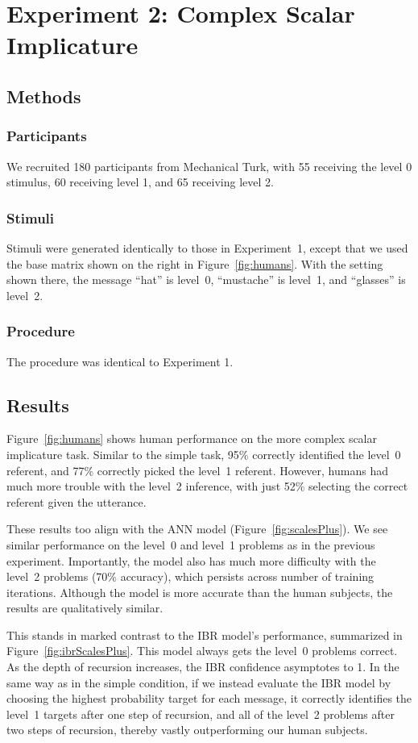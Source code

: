 \section{Experiment 2: Complex Scalar Implicature}

\subsection{Methods}

\subsubsection{Participants} 

We recruited 180 participants from Mechanical Turk, with 55 receiving
the level 0 stimulus, 60 receiving level 1, and 65 receiving level 2.

\subsubsection{Stimuli}

Stimuli were generated identically to those in Experiment~1, except
that we used the base matrix shown on the right in
Figure~\ref{fig:humans}. With the setting shown there, the message
``hat'' is level~0, ``mustache'' is level~1, and ``glasses'' is
level~2.

\subsubsection{Procedure}

The procedure was identical to Experiment 1. 

\subsection{Results}

Figure~\ref{fig:humans} shows human performance on the more complex
scalar implicature task. Similar to the simple task, 95\% correctly
identified the level~0 referent, and 77\% correctly picked the level~1
referent. However, humans had much more trouble with the level~2
inference, with just 52\% selecting the correct referent given the
utterance.

These results too align with the ANN model
(Figure~\ref{fig:scalesPlus}). We see similar performance on the
level~0 and level~1 problems as in the previous
experiment. Importantly, the model also has much more difficulty with
the level~2 problems (70\% accuracy), which persists across number of training
iterations. Although the model is more accurate than the human
subjects, the results are qualitatively similar. 

This stands in marked contrast to the IBR model's performance, summarized in
Figure~\ref{fig:ibrScalesPlus}. This model always gets the level~0
problems correct. As the depth of recursion increases, the IBR
confidence asymptotes to 1. In the same way as in the simple
condition, if we instead evaluate the IBR model by choosing the
highest probability target for each message, it correctly identifies
the level~1 targets after one step of recursion, and all of the
level~2 problems after two steps of recursion, thereby vastly
outperforming our human subjects.
